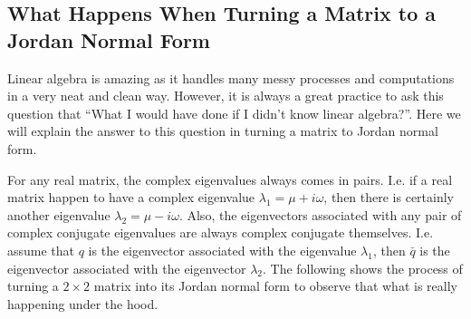 \subsection{What Happens When Turning a Matrix to a Jordan Normal Form}
Linear algebra is amazing as it handles many messy processes and computations in a very neat and clean way. However, it is always a great practice to ask this question that ``What I would have done if I didn't know linear algebra?''. Here we will explain the answer to this question in turning a matrix to Jordan normal form. 

For any real matrix, the complex eigenvalues always comes in pairs. I.e. if a real matrix happen to have a complex eigenvalue $\lambda_1 = \mu+i\omega$, then there is certainly another eigenvalue $\lambda_2 = \mu-i\omega$. Also, the eigenvectors associated with any pair of complex conjugate eigenvalues are always complex conjugate themselves. I.e. assume that $q$ is the eigenvector associated with the eigenvalue $\lambda_1$, then $\bar{q}$ is the eigenvector associated with the eigenvector $\lambda_2$. The following shows the process of turning a $2\times2$ matrix into its Jordan normal form to observe that what is really happening under the hood.

